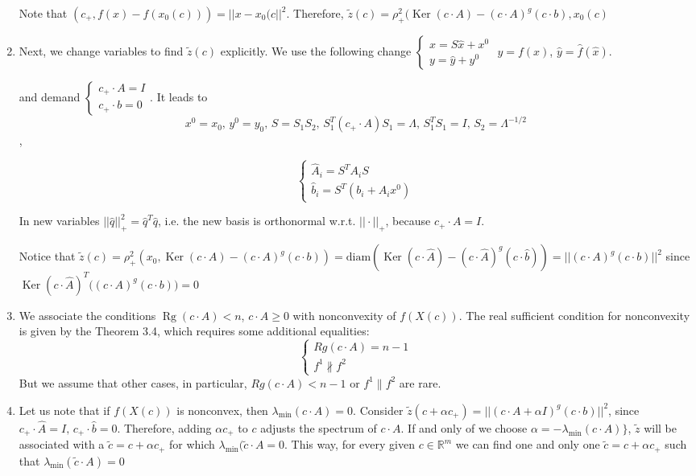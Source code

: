 \documentclass[a4paper]{article}
\DeclareMathOperator{\Rg}{Rg}
\DeclareMathOperator{\Ker}{Ker}
\begin{document}
\begin{enumerate}
Note that $(c_+,f(x)-f(x_0(c)))=||x-x_0(c||^2$.
Therefore, $\tilde{z}(c)=\rho_+^2(\Ker(c\cdot A)-(c\cdot A)^g(c\cdot b),x_0(c)$
\item Next, we change variables to find $\tilde{z}(c)$ explicitly. We use the following change
$\begin{cases}
x=S\hat{x}+x^0\\
y=\hat{y}+y^0
\end{cases}$ $y=f(x)$, $\hat{y}=\hat{f}(\hat{x})$.

and demand $\begin{cases}
c_+\cdot A=I\\
c_+\cdot b=0
\end{cases}$. It leads to
$$x^0=x_0,\,y^0=y_0,\,S=S_1S_2,\, S_1^T(c_+\cdot A)S_1=\Lambda,\,S_1^TS_1=I,\,S_2=\Lambda^{-1/2}$$,

$$\begin{cases}
\hat{A}_i=S^TA_iS\\
\hat{b}_i=S^T(b_i+A_ix^0)
\end{cases}$$

In new variables $||\hat{q}||_+^2=\hat{q}^T\hat{q}$, i.e. the new basis is orthonormal w.r.t. $||\cdot||_+$, because $c_+\cdot A=I$.


Notice that $\tilde{z}(c)=\rho_+^2(x_0,\Ker (c\cdot A)-(c\cdot A)^g(c\cdot b))=\mathrm{diam}(\Ker(c\cdot \hat{A})-(c\cdot \hat{A})^g(c\cdot \hat{b}))=||(c\cdot A)^g(c\cdot b)||^2$ since $\Ker(c\cdot \hat{A})^T\big((c\cdot A)^g(c\cdot b)\big)=0$

\item We associate the conditions $\Rg(c\cdot A)<n$, $c\cdot A\geqslant 0$ with nonconvexity of $f(X(c))$. The real sufficient condition for nonconvexity is given by the Theorem 3.4, which requires some additional equalities:
$$
\begin{cases}
Rg(c\cdot A)=n-1\\
f^1\nparallel f^2
\end{cases}
$$
But we assume that other cases, in particular, $Rg(c\cdot A)<n-1$ or $f^1\parallel f^2$ are rare.

\item Let us note that if $f(X(c))$ is nonconvex, then $\lambda_{\min}(c\cdot A)=0$. Consider $\tilde{z}(c+\alpha c_+)=||(c\cdot A+\alpha I)^g(c\cdot b)||^2$, since $c_+\cdot\hat{A}=I,\,c_+\cdot\hat{b}=0$. Therefore, adding $\alpha c_+$ to $c$ adjusts the spectrum of $c\cdot A$. If and only of we choose $\alpha=-\lambda_{\min}(c\cdot A)\}$, $\tilde{z}$ will be associated with a $\tilde{c}=c+\alpha c_+$ for which $\lambda_{\min}(\tilde{c}\cdot A=0$. This way, for every given $c\in\mathbb{R}^m$ we can find one and only one $\tilde{c}=c+\alpha c_+$ such that $\lambda_{\min}(\tilde{c}\cdot A)=0$


\end{enumerate}
\end{document}
